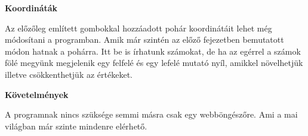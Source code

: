 \textbf{Koordináták}

Az előzőleg említett gombokkal hozzáadott pohár koordinátáit lehet még módosítani a programban. Amik már szintén az előző fejezetben  bemutatott módon hatnak a pohárra. Itt be is írhatunk számokat, de ha az egérrel a számok fölé megyünk megjelenik egy felfelé és egy lefelé mutató nyíl, amikkel növelhetjük illetve csökkenthetjük az értékeket. 

\textbf{Követelmények}

A programnak nincs szüksége semmi másra csak egy webböngészőre. Ami a mai világban már szinte mindenre elérhető. 

